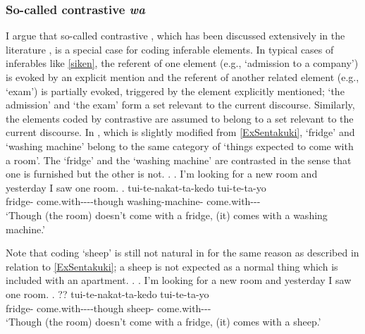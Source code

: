 \subsubsection{So-called contrastive \textit{wa}}


I argue that so-called contrastive ,
which has been discussed extensively in the literature \cite[e.g.,][]{kuno73},
is a special case for  coding inferable elements.
In typical cases of inferables like \ref{siken},
the referent of one element (e.g.,  `admission to a company') is evoked by an explicit mention and the referent of another related element (e.g.,  `exam') is partially evoked, triggered by the element explicitly mentioned;
`the admission' and `the exam' form a set relevant to the current discourse.
Similarly, the elements coded by contrastive 
are assumed to belong to a set relevant to the current discourse.
In \Next, which is slightly modified from \ref{ExSentakuki},
 `fridge' and  `washing machine' belong to the same category of `things expected to come with a room'.
The `fridge' and the `washing machine' are contrasted
in the sense that
one is furnished but the other is not.
%
\ex.
 \a. I'm looking for a new room and yesterday I saw one room.
 \bg.  tui-te-nakat-ta-kedo  tui-te-ta-yo \\
 	fridge- come.with----though washing-machine- come.with--- \\
	`Though (the room) doesn't come with a fridge, (it) comes with a washing machine.'

Note that  coding  `sheep' is still not natural in \Next
for the same reason as described in relation to \ref{ExSentakuki};
a sheep is not expected as a normal thing which is included with an apartment.
%
\ex.
 \a. I'm looking for a new room and yesterday I saw one room.
 \bg. ?? tui-te-nakat-ta-kedo  tui-te-ta-yo \\
 	fridge- come.with----though sheep- come.with--- \\
	`Though (the room) doesn't come with a fridge, (it) comes with a sheep.'

